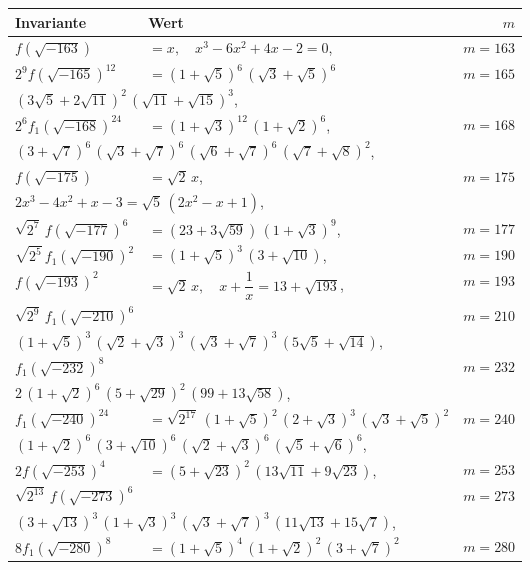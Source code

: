 \documentclass[12pt,a4paper]{article}
\begin{document}
\newpage
\setcounter{page}{725}

\begin{longtable}{@{}llr@{}}
\toprule
\multicolumn{1}{l}{\textbf{Invariante}} & \multicolumn{1}{l}{\textbf{Wert}} & $m$ \\
\midrule
\endhead
$f(\sqrt{-163})$ &$= x,\quad x^3-6x^2+4x-2=0$, & $m=163$ \\
$2^9f(\sqrt{-165})^{12}$ &$= (1+\sqrt{5})^6\,(\sqrt{3}+\sqrt{5})^6$ & $m=165$ \\
\multicolumn{3}{l}{\qquad$(3\sqrt{5}+2\sqrt{11})^2\,(\sqrt{11}+\sqrt{15})^3$,} \\
$2^6f_1(\sqrt{-168})^{24}$ &$= (1+\sqrt{3})^{12}\,(1+\sqrt{2})^6$, & $m=168$ \\
\multicolumn{3}{l}{\qquad$(3+\sqrt{7})^6\,(\sqrt{3}+\sqrt{7})^6\,(\sqrt{6}+\sqrt{7})^6\,(\sqrt{7}+\sqrt{8})^2$,} \\
$f(\sqrt{-175})$ &$= \sqrt{2}\,x$, & $m=175$ \\
\multicolumn{3}{l}{\qquad$2x^3-4x^2+x-3=\sqrt{5}\,(2x^2-x+1)$,} \\
$\sqrt{2^7}\,f(\sqrt{-177})^6$ &$= (23+3\sqrt{59})\,(1+\sqrt{3})^9$, & $m=177$ \\
$\sqrt{2^5}\,f_1(\sqrt{-190})^2$ &$= (1+\sqrt{5})^3\,(3+\sqrt{10})$, & $m=190$ \\
$f(\sqrt{-193})^2$ &$= \sqrt{2}\,x,\quad x+\dfrac{1}{x}=13+\sqrt{193}$, & $m=193$ \\
$\sqrt{2^9}\,f_1(\sqrt{-210})^6$ & & $m=210$ \\
\multicolumn{3}{l}{\qquad$(1+\sqrt{5})^3\,(\sqrt{2}+\sqrt{3})^3\,(\sqrt{3}+\sqrt{7})^3\,(5\sqrt{5}+\sqrt{14})$,} \\
$f_1(\sqrt{-232})^8$ & & $m=232$ \\
\multicolumn{3}{l}{\qquad$2\,(1+\sqrt{2})^6\,(5+\sqrt{29})^2\,(99+13\sqrt{58})$,} \\
$f_1(\sqrt{-240})^{24}$ &$= \sqrt{2^{17}}\,(1+\sqrt{5})^2\,(2+\sqrt{3})^3\,(\sqrt{3}+\sqrt{5})^2$ & $m=240$ \\
\multicolumn{3}{l}{\qquad$(1+\sqrt{2})^6\,(3+\sqrt{10})^6\,(\sqrt{2}+\sqrt{3})^6\,(\sqrt{5}+\sqrt{6})^6$,} \\
$2f(\sqrt{-253})^4$ &$= (5+\sqrt{23})^2\,(13\sqrt{11}+9\sqrt{23})$, & $m=253$ \\
$\sqrt{2^{13}}\,f(\sqrt{-273})^6$ & & $m=273$ \\
\multicolumn{3}{l}{\qquad$(3+\sqrt{13})^3\,(1+\sqrt{3})^3\,(\sqrt{3}+\sqrt{7})^3\,(11\sqrt{13}+15\sqrt{7})$,} \\
$8f_1(\sqrt{-280})^8$ &$= (1+\sqrt{5})^4\,(1+\sqrt{2})^2\,(3+\sqrt{7})^2$ & $m=280$ \\

\end{longtable}
\end{document}
